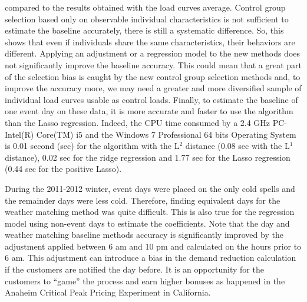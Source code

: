 \documentclass[journal]{IEEEtran}
\begin{document}
compared to the results obtained with the load curves average. Control group 
selection based only on observable individual characteristics is not sufficient to 
estimate the baseline accurately, there is still a systematic difference. So, 
this shows that even if individuals share the same 
characteristics, their behaviors are different. Applying an adjustment or a regression 
model to the new methods does not significantly improve the baseline accuracy. This could 
mean that a great part of the selection bias is caught by the new control group selection methods 
and, to improve the accuracy more, we may need a greater and more diversified sample 
of individual load curves usable as control loads. Finally, to estimate the baseline 
of one event day on these data, it 
is more accurate and faster to use the algorithm than the Lasso regression. Indeed, the CPU time 
consumed by a 2.4 GHz PC-Intel(R) Core(TM) i5 and the Windows 7 Professional 64 bits Operating 
System is 0.01 second (sec) for the algorithm with the L$^2$ distance (0.08 sec with the L$^1$ 
distance), 0.02 sec for the ridge regression and 1.77 sec for the Lasso regression (0.44 sec for 
the positive Lasso). 

During the 2011-2012 winter, event days were placed on the only cold 
spells and the remainder days were less cold. Therefore, finding equivalent days 
for the weather matching method was quite difficult. This is also true for the 
regression model using non-event days to estimate the coefficients. Note that the 
day and weather matching baseline methods accuracy is significantly improved by the 
adjustment applied between 6 am and 10 pm and calculated on the hours prior to 6 am. This adjustment 
can introduce a bias in the demand reduction calculation if the customers are notified 
the day before. It is an opportunity for the customers to ``game'' the process and earn 
higher bonuses as happened in the Anaheim Critical Peak Pricing Experiment in California.
\end{document}
